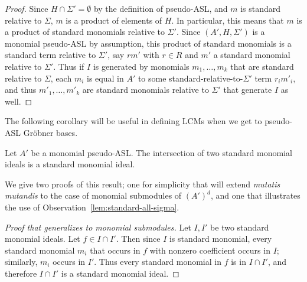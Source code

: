 \documentclass[11pt,reqno]{amsart}
\theoremstyle{definition}
\numberwithin{equation}{section}
\begin{document}
\begin{proof}
Since $H \cap \Sigma' = \emptyset$ by the definition of pseudo-ASL, and $m$ is standard relative to $\Sigma$, $m$ is a product of elements of $H$. In particular, this means that $m$ is a product of standard monomials relative to $\Sigma'$. Since $(A',H,\Sigma')$ is a monomial pseudo-ASL by assumption, this product of standard monomials is a standard term relative to $\Sigma'$, say $rm'$ with $r \in R$ and $m'$ a standard monomial relative to $\Sigma'$. Thus if $I$ is generated by monomials $m_1, \dotsc, m_k$ that are standard relative to $\Sigma$, each $m_i$ is equal in $A'$ to some standard-relative-to-$\Sigma'$ term $r_i m'_i$, and thus $m'_1, \dotsc, m'_k$ are standard monomials relative to $\Sigma'$ that generate $I$ as well.
\end{proof}

The following corollary will be useful in defining LCMs when we get to pseudo-ASL Gröbner bases.

\begin{corollary}[{cf. \cite[Cor~1.6(a)]{ES}}] \label{cor:intersection-monomial}
Let $A'$ be a monomial pseudo-ASL. The intersection of two standard monomial ideals is a standard monomial ideal.
\end{corollary}

We give two proofs of this result; one for simplicity that will extend \emph{mutatis mutandis} to the case of monomial submodules of $(A')^d$, and one that illustrates the use of Observation~\ref{lem:standard-all-sigma}.

\begin{proof}[Proof that generalizes to monomial submodules]
Let $I,I'$ be two standard monomial ideals. Let $f \in I \cap I'$. Then since $I$ is standard monomial, every standard monomial $m_i$ that occurs in $f$ with nonzero coefficient occurs in $I$; similarly, $m_i$ occurs in $I'$. Thus every standard monomial in $f$ is in $I \cap I'$, and therefore $I \cap I'$ is a standard monomial ideal.
\end{proof}
\end{document}
